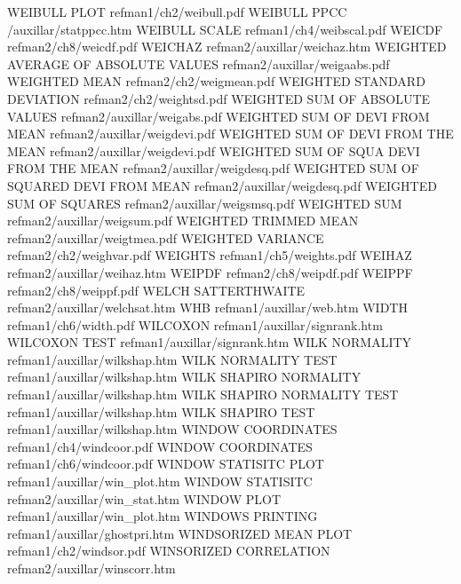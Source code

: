 WEIBULL PLOT                            refman1/ch2/weibull.pdf
WEIBULL PPCC                            /auxillar/statppcc.htm
WEIBULL SCALE                           refman1/ch4/weibscal.pdf
WEICDF                                  refman2/ch8/weicdf.pdf
WEICHAZ                                 refman2/auxillar/weichaz.htm
WEIGHTED AVERAGE OF ABSOLUTE VALUES     refman2/auxillar/weigaabs.pdf
WEIGHTED MEAN                           refman2/ch2/weigmean.pdf
WEIGHTED STANDARD DEVIATION             refman2/ch2/weightsd.pdf
WEIGHTED SUM OF ABSOLUTE VALUES         refman2/auxillar/weigabs.pdf
WEIGHTED SUM OF DEVI FROM MEAN          refman2/auxillar/weigdevi.pdf
WEIGHTED SUM OF DEVI FROM THE MEAN      refman2/auxillar/weigdevi.pdf
WEIGHTED SUM OF SQUA DEVI FROM THE MEAN refman2/auxillar/weigdesq.pdf
WEIGHTED SUM OF SQUARED DEVI FROM MEAN  refman2/auxillar/weigdesq.pdf
WEIGHTED SUM OF SQUARES                 refman2/auxillar/weigsmsq.pdf
WEIGHTED SUM                            refman2/auxillar/weigsum.pdf
WEIGHTED TRIMMED MEAN                   refman2/auxillar/weigtmea.pdf
WEIGHTED VARIANCE                       refman2/ch2/weighvar.pdf
WEIGHTS                                 refman1/ch5/weights.pdf
WEIHAZ                                  refman2/auxillar/weihaz.htm
WEIPDF                                  refman2/ch8/weipdf.pdf
WEIPPF                                  refman2/ch8/weippf.pdf
WELCH SATTERTHWAITE                     refman2/auxillar/welchsat.htm
WHB                                     refman1/auxillar/web.htm
WIDTH                                   refman1/ch6/width.pdf
WILCOXON                                refman1/auxillar/signrank.htm
WILCOXON TEST                           refman1/auxillar/signrank.htm
WILK NORMALITY                          refman1/auxillar/wilkshap.htm
WILK NORMALITY TEST                     refman1/auxillar/wilkshap.htm
WILK SHAPIRO NORMALITY                  refman1/auxillar/wilkshap.htm
WILK SHAPIRO NORMALITY TEST             refman1/auxillar/wilkshap.htm
WILK SHAPIRO TEST                       refman1/auxillar/wilkshap.htm
WINDOW COORDINATES                      refman1/ch4/windcoor.pdf
WINDOW COORDINATES                      refman1/ch6/windcoor.pdf
WINDOW STATISITC PLOT                   refman1/auxillar/win_plot.htm
WINDOW STATISITC                        refman2/auxillar/win_stat.htm
WINDOW PLOT                             refman1/auxillar/win_plot.htm
WINDOWS PRINTING                        refman1/auxillar/ghostpri.htm
WINDSORIZED MEAN PLOT                   refman1/ch2/windsor.pdf
WINSORIZED CORRELATION                  refman2/auxillar/winscorr.htm
